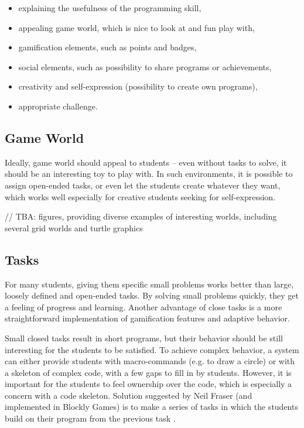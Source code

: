 \begin{itemize}
\item explaining the usefulness of the programming skill,
\item appealing game world, which is nice to look at and fun play with,
\item gamification elements, such as points and badges,
\item social elements, such as possibility to share programs or achievements,
\item creativity and self-expression (possibility to create own programs),
\item appropriate challenge.
\end{itemize}


\subsection{Game World}
\label{sec:motivation.game-world}
Ideally, game world should appeal to students --
even without tasks to solve,
  it should be an interesting toy to play with.
In such environments, it is possible to assign open-ended tasks,
  or even let the students create whatever they want,
  which works well especially for creative students seeking for self-expression.

// TBA: figures, providing diverse examples of interesting worlds, including several grid worlds and turtle graphics


\subsection{Tasks}
\label{sec:motivation.tasks}
For many students, giving them specific small problems works better
  than large, loosely defined and open-ended tasks.
By solving small problems quickly,
  they get a feeling of progress and learning.
Another advantage of close tasks
  is a more straightforward implementation of gamification features and adaptive behavior.

Small closed tasks result in short programs,
  but their behavior should be still interesting for the students to be satisfied.
To achieve complex behavior,
  a system can either provide students with macro-commands (e.g. to draw a circle)
  or with a skeleton of complex code, with a few gaps to fill in by students.
However, it is important for the students to feel ownership over the code,
  which is especially a concern with a code skeleton.
Solution suggested by Neil Fraser (and implemented in Blockly Games)
  is to make a series of tasks in which the students
  build on their program from the previous task
  \cite{blockly-10-things}.

